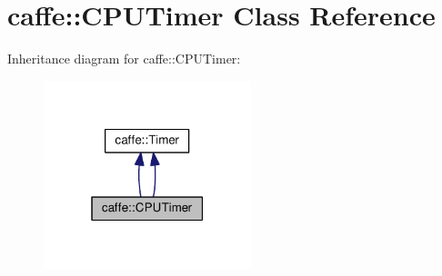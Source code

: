\hypertarget{classcaffe_1_1_c_p_u_timer}{}\section{caffe\+:\+:C\+P\+U\+Timer Class Reference}
\label{classcaffe_1_1_c_p_u_timer}


Inheritance diagram for caffe\+:\+:C\+P\+U\+Timer\+:
\nopagebreak
\begin{figure}[H]
\begin{center}
\leavevmode
\includegraphics[width=171pt]{classcaffe_1_1_c_p_u_timer__inherit__graph}
\end{center}
\end{figure}
